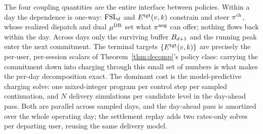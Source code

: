 The four coupling quantities are the entire interface between policies.
Within a day the dependence is one-way: $\mathrm{FSL}_d$ and $E^{\mathrm{tgt}}(v,k)$
constrain and steer $\pi^{\mathrm{ch}}$, whose realized dispatch and dual $\mu^{\mathrm{DR}}$
set what $\pi^{\mathrm{neg}}$ can offer; nothing flows back within the day. Across days only the surviving buffer $B_{d{+}1}$ and the running peak enter the next commitment. The terminal targets $\{E^{\mathrm{tgt}}(v,k)\}$ are precisely the per-user, per-session scalars of Theorem~\ref{thm:decomp}'s policy class: carrying the commitment down into charging through this small set of numbers is what makes the per-day decomposition exact.
The dominant cost is the model-predictive charging solve: one
mixed-integer program per control step per sampled continuation, and
$N$ delivery simulations per candidate level in the day-ahead pass. Both
are parallel across sampled days, and the day-ahead pass is amortized over
the whole operating day; the settlement replay adds two rates-only
solves per departing user, reusing the same delivery model.